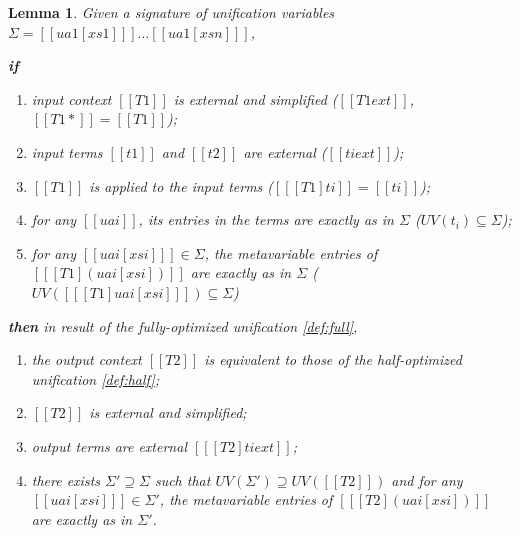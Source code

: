 \documentclass[a4,natbib=false]{article}
\newtheorem{lemma}{Lemma}
\begin{document}
\begin{lemma}
  Given a signature of unification variables $\Sigma = [[ ua1[xs1] ]] \dots [[ ua1[xsn] ]]$,

  \textbf{if}
  \begin{enumerate}
    \item input context $ [[ T1 ]] $  is external and simplified ($ [[ T1 ext ]]
      $,  $ [[ T1 * ]] = [[ T1 ]] $);
    \item input terms $ [[ t1 ]] $ and $ [[ t2 ]] $ are external ($ [[ ti ext ]] $);
    \item $ [[ T1 ]] $ is applied to the input terms ($ [[ [T1] ti ]] = [[ ti ]] $);
    \item for any $ [[ uai ]] $, its entries in the terms are exactly as in
      $\Sigma$ ($UV(t_i) \subseteq \Sigma$);
    \item for any $ [[ uai[xsi] ]] \in \Sigma $, the metavariable entries of 
      $ [[ [T1](uai[xsi]) ]] $ are exactly as in $\Sigma$ ($UV([[ [T1]uai[xsi] ]]) \subseteq \Sigma$)
  \end{enumerate}

  \textbf{then} in result of the fully-optimized unification \ref{def:full},
    \begin{enumerate}
    \item the output context $ [[ T2 ]] $  is equivalent to those of the
      half-optimized unification \ref{def:half};
    \item $ [[ T2 ]] $ is external and simplified;
    \item output terms are external $ [[ [T2] ti ext ]] $;
    \item there exists $\Sigma' \supseteq \Sigma$ such that 
      $UV(\Sigma') \supseteq UV( [[ T2 ]] )$ and
      for any $ [[ uai[xsi] ]] \in \Sigma' $, the metavariable entries of 
      $ [[ [T2](uai[xsi]) ]] $ are exactly as in $\Sigma'$.
  \end{enumerate}
  
\end{lemma}
\end{document}
